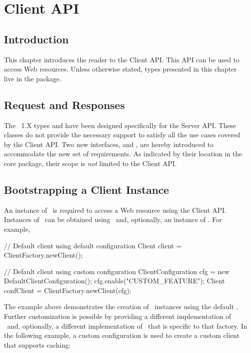 \chapter{Client API}
\label{client_api}

\section{Introduction}
\label{introduction}

This chapter introduces the reader to the Client API. This API can be used to access Web resources. Unless otherwise stated, types presented in this chapter live in the  package.

\section{Request and Responses}

The \jaxrs\ 1.X types  and  have been designed specifically for the Server API. These classes do not provide the necessary support to satisfy all the use cases covered by the Client API. Two new interfaces,    and , are hereby introduced to accommodate the new set of requirements. As indicated by their location in the core package, their scope is \emph{not} limited to the Client API. 

\section{Bootstrapping a Client Instance}

An instance of \Client\ is required to access a Web resource using the Client API. Instances of \Client\ can be obtained using \ClientFactory\ and, optionally, an instance of \ClientConfiguration. For example,

\begin{listing}{1}
// Default client using default configuration
Client client = ClientFactory.newClient();

// Default client using custom configuration
ClientConfiguration cfg = new DefaultClientConfiguration();
cfg.enable("CUSTOM_FEATURE");
Client confClient = ClientFactory.newClient(cfg);
\end{listing}

The example above demonstrates the creation of \Client\ instances using the default \ClientBuilderFactory. Further customization is possible by providing a different implementation of \ClientBuilderFactory\ and, optionally, a different implementation of \ClientConfiguration\ that is specific to that factory. In the following example, a custom configuration is used to create a custom client that supports caching:

